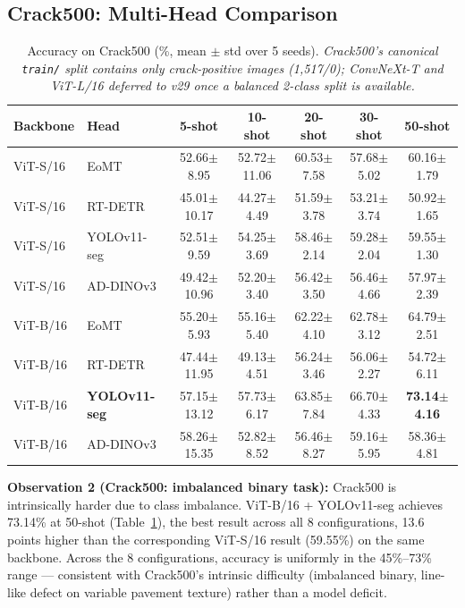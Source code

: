 \documentclass[journal]{IEEEtran}
\begin{document}
\subsection{Crack500: Multi-Head Comparison}
\begin{table}[!ht]
\centering
\caption{Accuracy on Crack500 (\%, mean $\pm$ std over 5 seeds). \emph{Crack500's canonical \texttt{train/} split contains only crack-positive images (1{,}517/0); ConvNeXt-T and ViT-L/16 deferred to v29 once a balanced 2-class split is available.}}
\label{tab:crack500}
\begin{tabular}{llccccc}
\toprule
Backbone & Head & 5-shot & 10-shot & 20-shot & 30-shot & 50-shot \\
\midrule
ViT-S/16 & EoMT & 52.66$\pm$8.95 & 52.72$\pm$11.06 & 60.53$\pm$7.58 & 57.68$\pm$5.02 & 60.16$\pm$1.79 \\
ViT-S/16 & RT-DETR & 45.01$\pm$10.17 & 44.27$\pm$4.49 & 51.59$\pm$3.78 & 53.21$\pm$3.74 & 50.92$\pm$1.65 \\
ViT-S/16 & YOLOv11-seg & 52.51$\pm$9.59 & 54.25$\pm$3.69 & 58.46$\pm$2.14 & 59.28$\pm$2.04 & 59.55$\pm$1.30 \\
ViT-S/16 & AD-DINOv3 & 49.42$\pm$10.96 & 52.20$\pm$3.40 & 56.42$\pm$3.50 & 56.46$\pm$4.66 & 57.97$\pm$2.39 \\
\midrule
ViT-B/16 & EoMT & 55.20$\pm$5.93 & 55.16$\pm$5.40 & 62.22$\pm$4.10 & 62.78$\pm$3.12 & 64.79$\pm$2.51 \\
ViT-B/16 & RT-DETR & 47.44$\pm$11.95 & 49.13$\pm$4.51 & 56.24$\pm$3.46 & 56.06$\pm$2.27 & 54.72$\pm$6.11 \\
ViT-B/16 & \textbf{YOLOv11-seg} & 57.15$\pm$13.12 & 57.73$\pm$6.17 & 63.85$\pm$7.84 & 66.70$\pm$4.33 & \textbf{73.14$\pm$4.16} \\
ViT-B/16 & AD-DINOv3 & 58.26$\pm$15.35 & 52.82$\pm$8.52 & 56.46$\pm$8.27 & 59.16$\pm$5.95 & 58.36$\pm$4.81 \\
\bottomrule
\end{tabular}
\end{table}

\textbf{Observation 2 (Crack500: imbalanced binary task):} Crack500 is intrinsically harder due to class imbalance. ViT-B/16 + YOLOv11-seg achieves 73.14\% at 50-shot (Table~\ref{tab:crack500}), the best result across all 8 configurations, 13.6 points higher than the corresponding ViT-S/16 result (59.55\%) on the same backbone. Across the 8 configurations, accuracy is uniformly in the 45\%--73\% range --- consistent with Crack500's intrinsic difficulty (imbalanced binary, line-like defect on variable pavement texture) rather than a model deficit.
\end{document}
